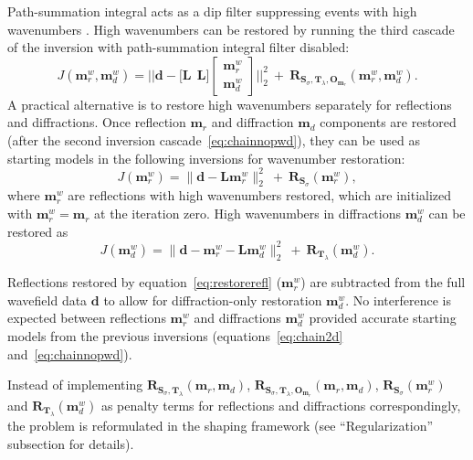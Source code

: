 Path-summation integral acts as a dip filter suppressing events with high wavenumbers \cite[]{merzlikin17}. High wavenumbers can be restored by running the third cascade of the inversion with path-summation integral filter disabled:
\begin{equation}
\label{eq:chainnopwdnopi}
J(\mathbf{m}_r^w,\mathbf{m}_d^w) = \Bigg|\Bigg| \mathbf{d} - \bigg[ \mathbf{L}\ \ \mathbf{L} \bigg] \begin{bmatrix} \mathbf{m}_r^w\\ \mathbf{m}_d^w \end{bmatrix} \Bigg|\Bigg|_{2}^{2}\ +\ \mathbf{R}_{\mathbf{S}_{\sigma},\mathbf{T}_{\lambda},\mathbf{O}_{\mathbf{m}_r}}(\mathbf{m}_r^w,\mathbf{m}_d^w).
\end{equation}
A practical alternative is to restore high wavenumbers separately for reflections and diffractions. Once reflection $\mathbf{m}_r$ and
diffraction $\mathbf{m}_d$ components are restored (after the second inversion cascade~\ref{eq:chainnopwd}), they can be used as starting models in the following inversions for wavenumber restoration:
\begin{equation}
\label{eq:restorerefl}
J(\mathbf{m}_r^{w}) = \| \mathbf{d} - \mathbf{L} \mathbf{m}_r^{w} \|_{2}^{2}\ +\ \mathbf{R}_{\mathbf{S}_{\sigma}}(\mathbf{m}_r^{w}),
\end{equation}
where $\mathbf{m}_r^{w}$ are reflections with high wavenumbers restored, which are initialized with $\mathbf{m}_r^{w}=\mathbf{m}_r$ at the iteration zero. High wavenumbers
in diffractions $\mathbf{m}_d^{w}$ can be restored as
\begin{equation}
\label{eq:restorediffr}
J(\mathbf{m}_d^{w}) = \| \mathbf{d} - \mathbf{m}_r^{w} - \mathbf{L} \mathbf{m}_d^{w} \|_{2}^{2}\ +\ \mathbf{R}_{\mathbf{T}_{\lambda}}(\mathbf{m}_d^{w}).
\end{equation}

Reflections restored by equation~\ref{eq:restorerefl} ($\mathbf{m}_r^{w}$) are subtracted from the full wavefield data $\mathbf{d}$ to allow
for diffraction-only restoration $\mathbf{m}_d^w$. No interference is expected between reflections $\mathbf{m}_r^{w}$ and diffractions $\mathbf{m}_d^w$
provided accurate starting models from the previous inversions (equations~\ref{eq:chain2d} and~\ref{eq:chainnopwd}).

Instead of implementing 
$\mathbf{R}_{\mathbf{S}_{\sigma},\mathbf{T}_{\lambda}}(\mathbf{m}_r,\mathbf{m}_d)$,
$\mathbf{R}_{\mathbf{S}_{\sigma},\mathbf{T}_{\lambda},\mathbf{O}_{\mathbf{m}_r}}(\mathbf{m}_r,\mathbf{m}_d)$,
$\mathbf{R}_{\mathbf{S}_{\sigma}}(\mathbf{m}_r^{w})$ and \-
$\mathbf{R}_{\mathbf{T}_{\lambda}}(\mathbf{m}_d^{w})$
as penalty terms for reflections and diffractions correspondingly, the problem is
reformulated in the shaping framework (see ``Regularization'' subsection for details). 

